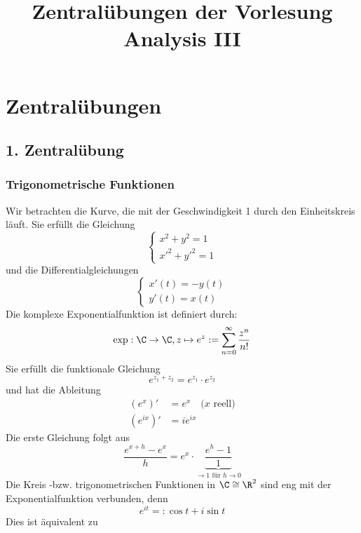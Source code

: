 
\title{Zentralübungen der Vorlesung Analysis III}

\appendix
\section{Zentralübungen}
\subsection{1. Zentralübung}
\subsubsection{Trigonometrische Funktionen}
Wir betrachten die Kurve, die mit der Geschwindigkeit 1 durch den Einheitskreis läuft. Sie erfüllt die Gleichung
\begin{equation*}
\begin{cases}
x^2+y^2=1 \\
x'^2 +y'^2 =1
\end{cases}
\end{equation*}
und die Differentialgleichungen
\begin{equation*}
\begin{cases}
x'(t)=-y(t)\\
y'(t)=x(t)
\end{cases}
\end{equation*}
Die komplexe Exponentialfunktion ist definiert durch:
\begin{equation*}
\exp: \C \to \C, z\mapsto e^z := \sum_{n=0}^\infty \frac{z^n}{n!}
\end{equation*}  
Sie erfüllt die funktionale Gleichung
\begin{equation*}
e^{z_1+z_2}=e^{z_1} \cdot e^{z_2}
\end{equation*}
und hat die Ableitung
\begin{align*}
(e^x)' & = e^x	\quad \text{($x$ reell)} \\
(e^{ix})' & = ie^{ix}
\end{align*}
Die erste Gleichung folgt aus
$$ \frac{e^{x+h}-e^x}{h} = e^x \cdot \underbrace{\frac{e^h-1}{1}}_{\longrightarrow 1 \text{ für } h \to 0} $$
Die Kreis -bzw. trigonometrischen Funktionen in $\C \cong \R^2$ sind eng mit der Exponentialfunktion verbunden, denn
\begin{equation*}
e^{it} =: \cos t +i\sin t \tag{eulersche Formel}
\end{equation*}
Dies ist äquivalent zu

